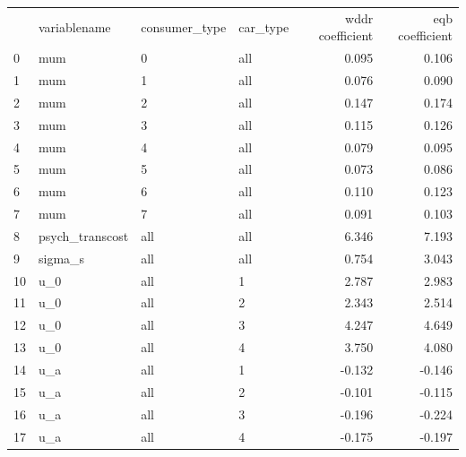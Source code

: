 \begin{tabular}{llllrr}
 & variablename & consumer_type & car_type & wddr coefficient & eqb coefficient \\
0 & mum & 0 & all & 0.095 & 0.106 \\
1 & mum & 1 & all & 0.076 & 0.090 \\
2 & mum & 2 & all & 0.147 & 0.174 \\
3 & mum & 3 & all & 0.115 & 0.126 \\
4 & mum & 4 & all & 0.079 & 0.095 \\
5 & mum & 5 & all & 0.073 & 0.086 \\
6 & mum & 6 & all & 0.110 & 0.123 \\
7 & mum & 7 & all & 0.091 & 0.103 \\
8 & psych_transcost & all & all & 6.346 & 7.193 \\
9 & sigma_s & all & all & 0.754 & 3.043 \\
10 & u_0 & all & 1 & 2.787 & 2.983 \\
11 & u_0 & all & 2 & 2.343 & 2.514 \\
12 & u_0 & all & 3 & 4.247 & 4.649 \\
13 & u_0 & all & 4 & 3.750 & 4.080 \\
14 & u_a & all & 1 & -0.132 & -0.146 \\
15 & u_a & all & 2 & -0.101 & -0.115 \\
16 & u_a & all & 3 & -0.196 & -0.224 \\
17 & u_a & all & 4 & -0.175 & -0.197 \\
\end{tabular}
